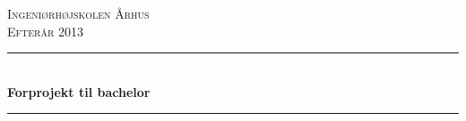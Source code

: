 \newcommand{\HRule}{\rule{\linewidth}{0.5mm}} %

\begin{center} %
 

\textsc{\LARGE Ingeniørhøjskolen Århus}\\[1.5cm] %
\textsc{\large Efterår 2013}\\[0.5cm] %


\HRule \\[0.4cm]
{ \huge \bfseries Forprojekt til bachelor}\\[0.4cm] %
\HRule \\[1.5cm]
 


\end{center}
